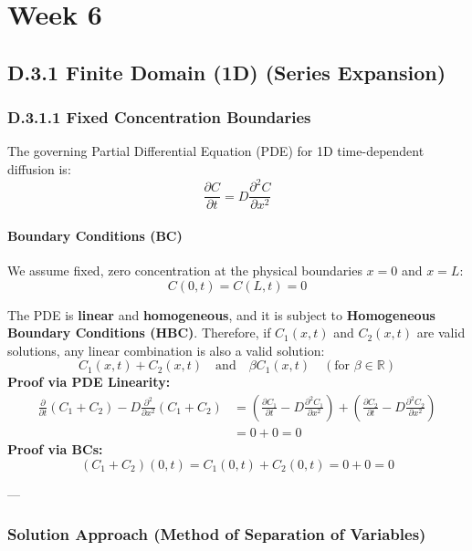 \section{Week 6}
\subsection{D.3.1 Finite Domain (1D) (Series Expansion)}

\subsubsection{D.3.1.1 Fixed Concentration Boundaries}

The governing Partial Differential Equation (PDE) for 1D time-dependent diffusion is:
\begin{equation}
\frac{\partial C}{\partial t} = D \frac{\partial^{2}C}{\partial x^{2}}
\end{equation}

\paragraph{Boundary Conditions (BC)}
We assume fixed, zero concentration at the physical boundaries $x=0$ and $x=L$:
\begin{equation}
C(0,t) = C(L,t) = 0
\end{equation}

\begin{conceptbox}
The PDE is \textbf{linear} and \textbf{homogeneous}, and it is subject to \textbf{Homogeneous Boundary Conditions (HBC)}. Therefore, if $C_{1}(x,t)$ and $C_{2}(x,t)$ are valid solutions, any linear combination is also a valid solution:
\[
C_{1}(x,t) + C_{2}(x,t) \quad \text{and} \quad \beta C_{1}(x,t) \quad (\text{for } \beta \in \mathbb{R})
\]
\textbf{Proof via PDE Linearity:}
\begin{align*}
\frac{\partial}{\partial t}(C_{1}+C_{2}) - D\frac{\partial^{2}}{\partial x^{2}}(C_{1}+C_{2}) &= \left(\frac{\partial C_{1}}{\partial t} - D\frac{\partial^{2}C_{1}}{\partial x^{2}}\right) + \left(\frac{\partial C_{2}}{\partial t} - D\frac{\partial^{2}C_{2}}{\partial x^{2}}\right) \\
&= 0 + 0 = 0
\end{align*}
\textbf{Proof via BCs:}
\[
(C_{1}+C_{2})(0,t) = C_{1}(0,t) + C_{2}(0,t) = 0 + 0 = 0
\]
\end{conceptbox}

---

\subsubsection{Solution Approach (Method of Separation of Variables)}


